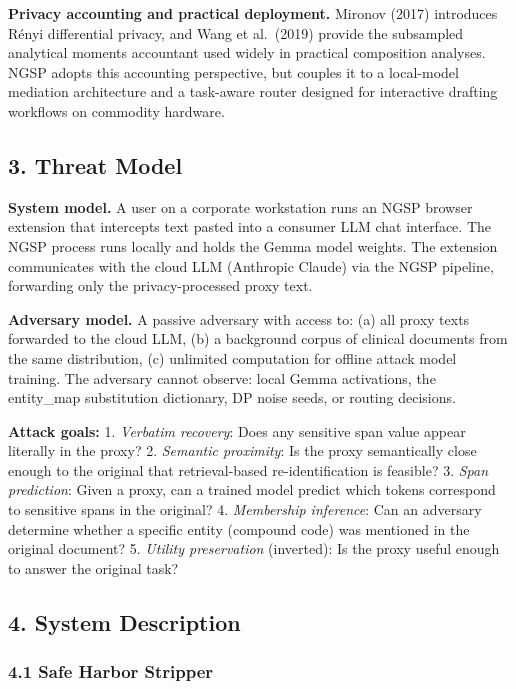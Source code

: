 \textbf{Privacy accounting and practical deployment.} Mironov (2017)
introduces Rényi differential privacy, and Wang et al.~(2019) provide
the subsampled analytical moments accountant used widely in practical
composition analyses. NGSP adopts this accounting perspective, but
couples it to a local-model mediation architecture and a task-aware
router designed for interactive drafting workflows on commodity
hardware.

\subsection{3. Threat Model}\label{threat-model}

\textbf{System model.} A user on a corporate workstation runs an NGSP
browser extension that intercepts text pasted into a consumer LLM chat
interface. The NGSP process runs locally and holds the Gemma model
weights. The extension communicates with the cloud LLM (Anthropic
Claude) via the NGSP pipeline, forwarding only the privacy-processed
proxy text.

\textbf{Adversary model.} A passive adversary with access to: (a) all
proxy texts forwarded to the cloud LLM, (b) a background corpus of
clinical documents from the same distribution, (c) unlimited computation
for offline attack model training. The adversary cannot observe: local
Gemma activations, the entity\_map substitution dictionary, DP noise
seeds, or routing decisions.

\textbf{Attack goals:} 1. \emph{Verbatim recovery}: Does any sensitive
span value appear literally in the proxy? 2. \emph{Semantic proximity}:
Is the proxy semantically close enough to the original that
retrieval-based re-identification is feasible? 3. \emph{Span
prediction}: Given a proxy, can a trained model predict which tokens
correspond to sensitive spans in the original? 4. \emph{Membership
inference}: Can an adversary determine whether a specific entity
(compound code) was mentioned in the original document? 5. \emph{Utility
preservation} (inverted): Is the proxy useful enough to answer the
original task?

\subsection{4. System Description}\label{system-description}

\subsubsection{4.1 Safe Harbor Stripper}\label{safe-harbor-stripper}

